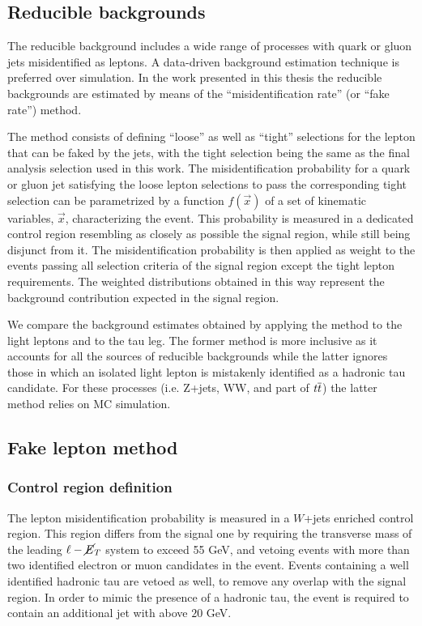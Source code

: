 \subsection{Reducible backgrounds}

The reducible background includes a wide range of processes with quark or gluon jets misidentified as leptons. %
A data-driven background estimation technique is preferred over simulation. %
In the work presented in this thesis the reducible backgrounds are estimated by means of the ``misidentification rate'' (or ``fake rate'') method.

The method consists of defining ``loose'' as well as ``tight'' selections for the lepton that can be faked by the jets, with the tight selection being the same as the final analysis selection used in this work.
The misidentification probability for a quark or gluon jet satisfying the loose lepton selections to pass the corresponding tight selection can be parametrized by a function $f(\vec{x})$ of a set of kinematic variables, $\vec{x}$, characterizing the event. This probability is measured in a dedicated control region resembling as closely as possible the signal region, while still being disjunct from it. The misidentification probability is then applied as weight to the events passing all selection criteria of the signal region except the tight lepton requirements. The weighted distributions obtained in this way represent the background contribution expected in the signal region.

We compare the background estimates obtained by applying the method to the light leptons and to the tau leg. 
The former method is more inclusive as it accounts for all the sources of reducible backgrounds while the latter ignores those in which an isolated light lepton is mistakenly identified as a hadronic tau candidate. For these processes (i.e. Z+jets, WW, and part of $t\overline{t}$) the latter method relies on MC simulation. 

\subsection{Fake lepton method}
\label{sec:fakemethod}
\subsubsection{Control region definition}
The lepton misidentification probability is measured in a $W$+jets enriched control region.
This region differs from the signal one by requiring the transverse mass of the leading $\ell-\cancel{E}_T$ system to exceed 55 GeV,
and vetoing events with more than two identified electron or muon candidates in the event. Events containing a well identified hadronic tau are vetoed as well, to remove any overlap with the signal region. In order to mimic the presence of a hadronic tau, the event is required to contain an additional jet with \pT above $20$ GeV.

